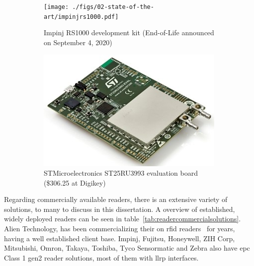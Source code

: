 \begin{figure}[H]
    \centering
    \begin{subfigure}{.35\textwidth}
        \centering
        \texttt{[image: ./figs/02-state-of-the-art/impinjrs1000.pdf]}
        \caption{Impinj RS1000 development kit (End-of-Life announced on September 4, 2020)} 
        \label{fig:impinjrs1000}
    \end{subfigure}
    \begin{subfigure}{.55\textwidth}
        \centering
        \includegraphics[width=\linewidth]{./figs/02-state-of-the-art/st25ru3993-eval.jpg}
        \caption{STMicroelectronics ST25RU3993 evaluation board (\$306.25 at Digikey)} 
        \label{fig:st25ru3993}
    \end{subfigure}
    \caption{} 
    \label{fig:devboards}
\end{figure}

Regarding commercially available readers, there is an extensive variety of solutions, to many to discuss in this dissertation. A overview of established, widely deployed readers can be seen in table~\ref{tab:readercommercialsolutions}.
Alien Technology, has been commercializing their on \ac{rfid} readers~\cite{AlienTechnologyReaders} for years, having a well established client base. Impinj, Fujitsu, Honeywell, ZIH Corp, Mitsubishi, Omron, Takaya, Toshiba, Tyco Sensormatic and Zebra also have \ac{epc} Class 1 \ac{gen2} reader solutions, most of them with \ac{llrp} interfaces.

